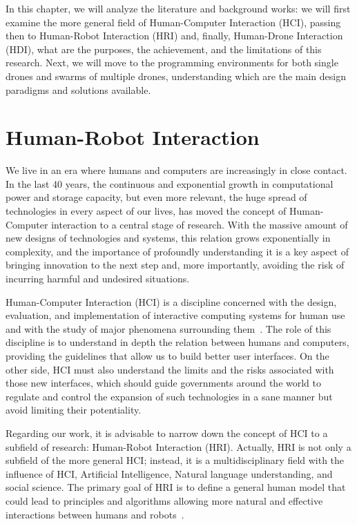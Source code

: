 In this chapter, we will analyze the literature and background works: we will first examine the more general field of Human-Computer Interaction (HCI), passing then to Human-Robot Interaction (HRI) and, finally, Human-Drone Interaction (HDI), what are the purposes, the achievement, and the limitations of this research. 
Next, we will move to the programming environments for both single drones and swarms of multiple drones, understanding 
which are the main design paradigms and solutions available. 


\section{Human-Robot Interaction}\label{sec:soa_hri}
We live in an era where humans and computers are increasingly in close contact. In the last 40 years, the continuous and exponential growth 
in computational power and storage capacity, but even more relevant, the huge spread of technologies in every aspect of our lives,
has moved the concept of Human-Computer interaction to a central stage of research. 
With the massive amount of new designs of technologies and systems, this relation grows exponentially in complexity, 
and the importance of profoundly understanding it is a key aspect of bringing innovation to the next step and, more importantly, 
avoiding the risk of incurring harmful and undesired situations.

Human-Computer Interaction (HCI) is a discipline concerned with the design, evaluation, and implementation of interactive computing systems for human use
and with the study of major phenomena surrounding them~\cite{sinha2010human}.
The role of this discipline is to understand in depth the relation between humans and computers, 
providing the guidelines that allow us to build better user interfaces. 
On the other side, HCI must also understand the limits and the risks associated with those new interfaces, which should guide governments around the world to regulate 
and control the expansion of such technologies in a sane manner but avoid limiting their potentiality.

Regarding our work, it is advisable to narrow down the concept of HCI to a subfield of research: Human-Robot Interaction (HRI). 
Actually, HRI is not only a subfield of the more general HCI; instead, it is a multidisciplinary field with the influence of HCI, 
Artificial Intelligence, Natural language understanding, and social science.
The primary goal of HRI is to define a general human model that could lead to principles and algorithms allowing more natural and 
effective interactions between humans and robots~\cite{hri2009davidMaya}.


